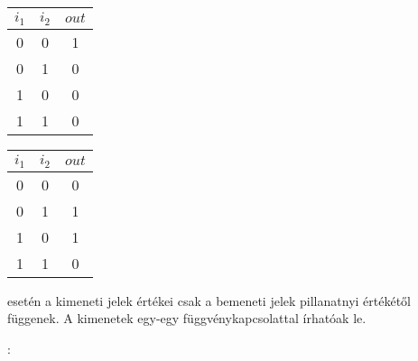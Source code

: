\documentclass[main.tex]{subfiles}
\begin{document}
  \begin{minipage}[t]{0.166\textwidth}
    \begin{center}
      \begin{tabular}{|c|c|c|}
        \hline
        $i_1$ & $i_2$ & $out$
        \\ \hline \hline
        0 & 0 & 1
        \\ \hline
        0 & 1 & 0
        \\ \hline
        1 & 0 & 0
        \\ \hline
        1 & 1 & 0
        \\ \hline
      \end{tabular}
    \end{center}
  \end{minipage}\hfill
  \begin{minipage}[t]{0.166\textwidth}
    \begin{center}
      \begin{tabular}{|c|c|c|}
        \hline
        $i_1$ & $i_2$ & $out$
        \\ \hline \hline
        0 & 0 & 0
        \\ \hline
        0 & 1 & 1
        \\ \hline
        1 & 0 & 1
        \\ \hline
        1 & 1 & 0
        \\ \hline
      \end{tabular}
    \end{center}
  \end{minipage}\hfill
  
   esetén a
  kimeneti jelek értékei csak a bemeneti jelek
  pillanatnyi értékétől függenek. A kimenetek
  egy-egy függvénykapcsolattal írhatóak le.

  \vspace{1em}
  {\large {}:}
\end{document}
